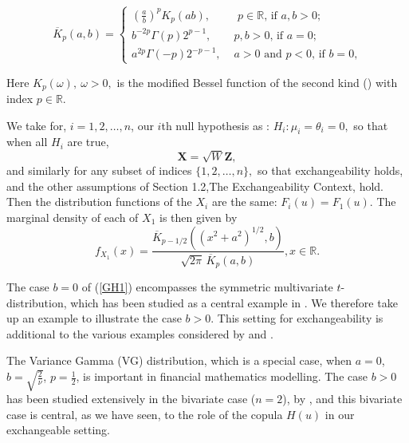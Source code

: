 \documentclass[12pt,fleqn] {article}
\newcommand{\R}{\mathbb{R}}
\newcommand{\adb}{\allowdisplaybreaks}
\newcommand{\inv}{\frac{1}}
\begin{document}
{\adb
\begin{equation}
 \overline{K}_{p}(a,b) = \begin{cases}
   (\frac{a}{b})^{p}K_{p}(ab),
   &\text{ $p \in\R$, if  $a,b >0$;}\\
   b^{-2p}\Gamma(p)2^{p-1}, &\text{
   $p ,b>0$, if $a=0$;}\\
   a^{2p}\Gamma(-p)2^{-p-1}, &\text{
   $a>0$ and $p <0$, if  $b=0$,}
 \end{cases}\label{Kbar}
\end{equation}

Here $K_{p}(\omega), \ \omega >0, $ is the modified Bessel function of the second kind (\cite{erdelyiBatemanManuscriptProject1954}) with index $p \in \R$. 

We take for, $i=1,2,\ldots , n$, our $i$th null hypothesis as : $ H_i: \mu_i = \theta_i = 0, $ so that when all $H_i$ are true, 
\begin{equation} \label{GH1}
\textbf{X} =  \sqrt{W}\textbf{Z}, 
\end{equation} and similarly for any subset of indices $\{1,2, \ldots, n \},$ so that exchangeability holds, and the other assumptions of Section 1.2,The Exchangeability Context,  hold. Then the distribution functions of the $X_i$ are the same: $F_i(u) =  F_1(u)$.  
The marginal density of each of $X_1$ is then given by
\begin{equation} \label{X1density}
f_{X_1}(x) = \frac{\overline{K}_{p-1/2}((x^2 +a^2)^{1/2}, b)}{{\sqrt{2\pi}\, {\overline{K}}_p(a,b)}}, x \in  \R.
\end{equation} %

The case $b=0$  of (\ref{GH1}) encompasses the symmetric multivariate $t$- distribution, which has been studied as a central example in \cite{sarkarImprovingHolmProcedure2016}.  We therefore take up an example to illustrate the case $b>0.$ This setting for exchangeability is additional  to the  various examples considered by \cite{sarkarSimesMethodMultiple1997} and \cite{sarkarImprovingHolmProcedure2016}.

The Variance Gamma (VG) distribution, which is a special case, when  $a=0$, $b = \sqrt{\frac{2}{\nu}}$, $p=\inv{2}$, is important in financial mathematics modelling.
The case $b>0$  has been studied extensively in the bivariate case ($n=2$), by \cite{fungTailAsymptoticsBivariate2016}, and this bivariate case is central, as we have seen,  to the role of the copula $H(u)$ in our exchangeable setting.

}
\end{document}
